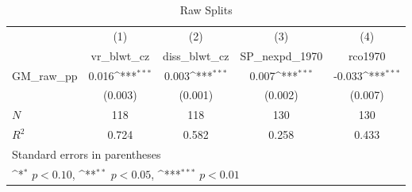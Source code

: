 \begin{table}[htbp]\centering
\def\sym#1{\ifmmode^{#1}\else\(^{#1}\)\fi}
\caption{Raw Splits}
\begin{tabular}{l*{4}{c}}
\hline\hline
            &\multicolumn{1}{c}{(1)}&\multicolumn{1}{c}{(2)}&\multicolumn{1}{c}{(3)}&\multicolumn{1}{c}{(4)}\\
            &\multicolumn{1}{c}{vr\_blwt\_cz}&\multicolumn{1}{c}{diss\_blwt\_cz}&\multicolumn{1}{c}{SP\_nexpd\_1970}&\multicolumn{1}{c}{rco1970}\\
\hline
GM\_raw\_pp   &       0.016\sym{***}&       0.003\sym{***}&       0.007\sym{***}&      -0.033\sym{***}\\
            &     (0.003)         &     (0.001)         &     (0.002)         &     (0.007)         \\
\hline
\(N\)       &         118         &         118         &         130         &         130         \\
\(R^{2}\)   &       0.724         &       0.582         &       0.258         &       0.433         \\
\hline\hline
\multicolumn{5}{l}{\footnotesize Standard errors in parentheses}\\
\multicolumn{5}{l}{\footnotesize \sym{*} \(p<0.10\), \sym{**} \(p<0.05\), \sym{***} \(p<0.01\)}\\
\end{tabular}
\end{table}
